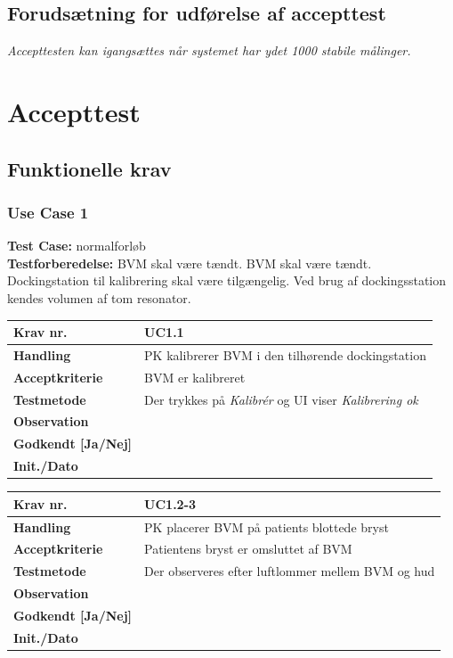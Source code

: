 		\subsection{Forudsætning for udførelse af accepttest}
		
		\textit{Accepttesten kan igangsættes når systemet har ydet 1000 stabile målinger.} 
\newpage 
		
\section{Accepttest}

		
\subsection{Funktionelle krav}

\subsubsection{Use Case 1}
\textbf{Test Case:} normalforløb \\
\textbf{Testforberedelse:} BVM skal være tændt. BVM skal være tændt. Dockingstation til kalibrering skal være tilgængelig. Ved brug af dockingsstation kendes volumen af tom resonator. \\

\begin{tabularx}{1\textwidth}{|l|X|}
\hline
\textbf{Krav nr.}              & UC1.1  \\ \hline
\textbf{Handling}				& PK kalibrerer BVM i den tilhørende dockingstation \\ \hline
\textbf{Acceptkriterie}        & BVM er kalibreret \\ \hline
\textbf{Testmetode}            & Der trykkes på \textit{Kalibrér} og UI viser \textit{Kalibrering ok} \\ \hline
\textbf{Observation}           &  \\ \hline
\textbf{Godkendt {[}Ja/Nej{]}} &  \\ \hline
\textbf{Init./Dato}            &  \\ \hline
\end{tabularx}
				


\begin{tabularx}{1\textwidth}{|l|X|}
\hline
\textbf{Krav nr.}              & UC1.2-3  \\ \hline
\textbf{Handling}				& PK placerer BVM på patients blottede bryst \\ \hline
\textbf{Acceptkriterie}        & Patientens bryst er omsluttet af BVM \\ \hline
\textbf{Testmetode}            & Der observeres efter luftlommer mellem BVM og hud \\ \hline
\textbf{Observation}           &  \\ \hline
\textbf{Godkendt {[}Ja/Nej{]}} &  \\ \hline
\textbf{Init./Dato}            &  \\ \hline
\end{tabularx}
		

